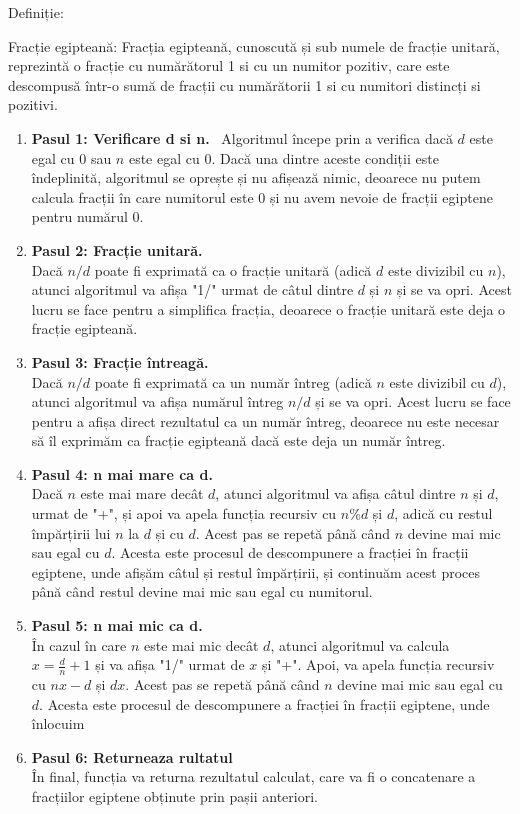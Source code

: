 \documentclass[runningheads]{llncs}
\begin{document}
Definiție:
\begin{center}
    Fracție egipteană: Fracția egipteană, cunoscută și sub numele de fracție 					unitară, reprezintă o fracție cu numărătorul 1 si cu un numitor pozitiv, care 				este descompusă într-o sumă de fracții cu numărătorii 1 si cu numitori 					distincți si pozitivi.

\end{center}

\begin{enumerate}
\item \textbf{Pasul 1: Verificare d si n.} \
Algoritmul începe prin a verifica dacă $d$ este egal cu 0 sau $n$ este egal cu 0. Dacă una dintre aceste condiții este îndeplinită, algoritmul se oprește și nu afișează nimic, deoarece nu putem calcula fracții în care numitorul este 0 și nu avem nevoie de fracții egiptene pentru numărul 0.

\item \textbf{Pasul 2: Fracție unitară.} \\
Dacă $n/d$ poate fi exprimată ca o fracție unitară (adică $d$ este divizibil cu $n$), atunci algoritmul va afișa "1/" urmat de câtul dintre $d$ și $n$ și se va opri. Acest lucru se face pentru a simplifica fracția, deoarece o fracție unitară este deja o fracție egipteană.

\item \textbf{Pasul 3: Fracție întreagă.} \\
Dacă $n/d$ poate fi exprimată ca un număr întreg (adică $n$ este divizibil cu $d$), atunci algoritmul va afișa numărul întreg $n/d$ și se va opri. Acest lucru se face pentru a afișa direct rezultatul ca un număr întreg, deoarece nu este necesar să îl exprimăm ca fracție egipteană dacă este deja un număr întreg.

\item \textbf{Pasul 4: n mai mare ca d.} \\
Dacă $n$ este mai mare decât $d$, atunci algoritmul va afișa câtul dintre $n$ și $d$, urmat de "+", și apoi va apela funcția recursiv cu $n\%d$ și $d$, adică cu restul împărțirii lui $n$ la $d$ și cu $d$. Acest pas se repetă până când $n$ devine mai mic sau egal cu $d$. Acesta este procesul de descompunere a fracției în fracții egiptene, unde afișăm câtul și restul împărțirii, și continuăm acest proces până când restul devine mai mic sau egal cu numitorul.

\item \textbf{Pasul 5: n mai mic ca d.} \\
În cazul în care $n$ este mai mic decât $d$, atunci algoritmul va calcula $x = \frac{d}{n} + 1$ și va afișa "1/" urmat de $x$ și "+". Apoi, va apela funcția recursiv cu $nx-d$ și $dx$. Acest pas se repetă până când $n$ devine mai mic sau egal cu $d$. Acesta este procesul de descompunere a fracției în fracții egiptene, unde înlocuim
\item \textbf{Pasul 6: Returneaza rultatul} \\În final, funcția va returna rezultatul calculat, care va fi o 							concatenare a fracțiilor egiptene obținute prin pașii anteriori.
\end{enumerate}
			
\end{document}
